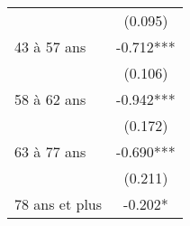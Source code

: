 \documentclass[a4paper,12pt]{article}
\begin{document}
\begin{table}[!htp]
\begin{minipage}{6cm}
{\begin{tabular}{lc}
		& (0.095)       \\
		43 à 57 ans                                                     & -0.712***     \\
		& (0.106)       \\
		58 à 62 ans                                                     & -0.942***     \\
		& (0.172)       \\
		63 à 77 ans                                                     & -0.690***     \\
		& (0.211)       \\
		78 ans et plus                                                  & -0.202*       \\
		\hline
	\end{tabular}}
\end{minipage}
\end{table}
\end{document}
